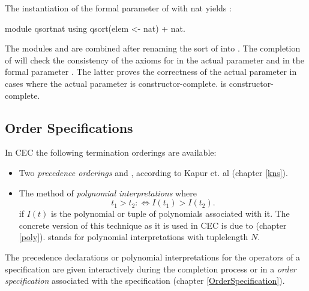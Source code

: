 The instantiation of the formal parameter of  with
nat yields :
\begin{spec}
module qsortnat using qsort(elem <- nat) + nat.
\end{spec}

The modules  and  are combined after
renaming the sort  of  into .
The completion of  will check the consistency of the axioms 
for \cec{=<} in the actual parameter  and in the formal
parameter . The latter proves the correctness
of the actual parameter in cases where the actual parameter is
constructor-complete.  is constructor-complete.

\subsection{Order Specifications}

In CEC the following termination orderings are available:
\begin{itemize}
\item
Two  {\em precedence orderings}  and , according to 
Kapur et. al \cite{KNS85} ( chapter \ref{kns}).
\item
The method of {\it polynomial interpretations}
where \[t_1 > t_2 : \iff I(t_1) > I(t_2). \]
if $I(t)$ is the polynomial or tuple of polynomials associated with
it.
The concrete version of this technique as it is used in CEC is due to 
\cite{CL86} ( chapter \ref{poly}).
 stands for polynomial interpretations with 
tuplelength $N$.
\end{itemize}
The precedence declarations or polynomial interpretations
for the operators of a specification are given interactively
during the completion process or in a {\em order specification}
associated with the specification
( chapter \ref{OrderSpecification}).

